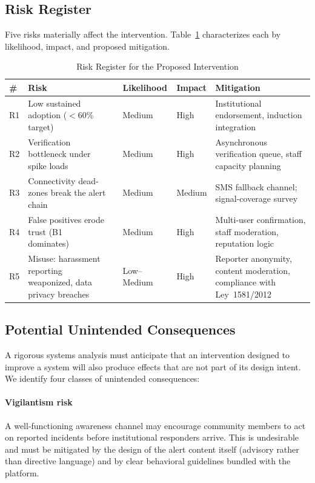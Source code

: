 \documentclass[conference]{IEEEtran}
\begin{document}
\subsection{Risk Register}
Five risks materially affect the intervention. Table~\ref{tab:risks}
characterizes each by likelihood, impact, and proposed mitigation.

\begin{table}[t]
\caption{Risk Register for the Proposed Intervention}
\label{tab:risks}
\centering
\renewcommand{\arraystretch}{1.25}
\begin{tabular}{p{0.5cm}p{4.4cm}cp{1.6cm}p{1.6cm}p{4.6cm}}
\toprule
\textbf{\#} & \textbf{Risk} & & \textbf{Likelihood} & \textbf{Impact} & \textbf{Mitigation} \\
\midrule
R1 & Low sustained adoption (\(<60\%\) target) & & Medium & High & Institutional endorsement, induction integration \\
R2 & Verification bottleneck under spike loads & & Medium & High & Asynchronous verification queue, staff capacity planning \\
R3 & Connectivity dead-zones break the alert chain & & Medium & Medium & SMS fallback channel; signal-coverage survey \\
R4 & False positives erode trust (B1 dominates) & & Medium & High & Multi-user confirmation, staff moderation, reputation logic \\
R5 & Misuse: harassment reporting weaponized, data privacy breaches & & Low--Medium & High & Reporter anonymity, content moderation, compliance with Ley~1581/2012 \cite{ley1581} \\
\bottomrule
\end{tabular}
\end{table}

\subsection{Potential Unintended Consequences}
A rigorous systems analysis must anticipate that an intervention
designed to improve a system will also produce effects that are not
part of its design intent. We identify four classes of unintended
consequences:

\paragraph{Vigilantism risk}
A well-functioning awareness channel may encourage community members
to act on reported incidents before institutional responders arrive.
This is undesirable and must be mitigated by the design of the alert
content itself (advisory rather than directive language) and by clear
behavioral guidelines bundled with the platform.
\end{document}
